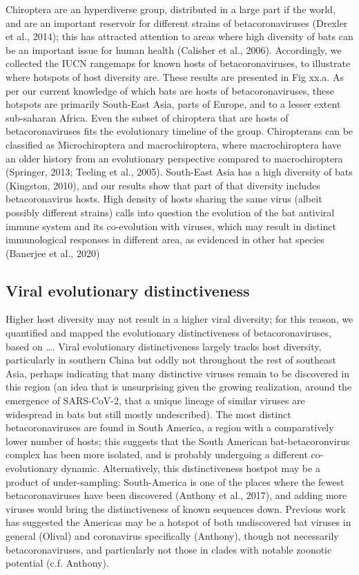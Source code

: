 \documentclass[10pt,oneside]{article}
\begin{document}
Chiroptera are an hyperdiverse group, distributed in a large part if the
world, and are an important reservoir for different strains of
betacoronaviruses (Drexler et al., 2014); this has attracted attention
to areas where high diversity of bats can be an important issue for
human health (Calisher et al., 2006). Accordingly, we collected the IUCN
rangemaps for known hosts of betacoronaviruses, to illustrate where
hotspots of host diversity are. These results are presented in Fig xx.a.
As per our current knowledge of which bats are hosts of
betacoronaviruses, these hotspots are primarily South-East Asia, parts
of Europe, and to a lesser extent sub-saharan Africa. Even the subset of
chiroptera that are hosts of betacoronaviruses fits the evolutionary
timeline of the group. Chiropterans can be classified as Microchiroptera
and macrochiroptera, where macrochiroptera have an older history from an
evolutionary perspective compared to macrochiroptera (Springer, 2013;
Teeling et al., 2005). South-East Asia has a high diversity of bats
(Kingston, 2010), and our results show that part of that diversity
includes betacoronavirus hosts. High density of hosts sharing the same
virus (albeit possibly different strains) calls into question the
evolution of the bat antiviral immune system and its co-evolution with
viruses, which may result in distinct immunological responses in
different area, as evidenced in other bat species (Banerjee et al.,
2020)

\hypertarget{viral-evolutionary-distinctiveness}{%
\subsection{Viral evolutionary
distinctiveness}\label{viral-evolutionary-distinctiveness}}

Higher host diversity may not result in a higher viral diversity; for
this reason, we quantified and mapped the evolutionary distinctiveness
of betacoronaviruses, based on \ldots. Viral evolutionary
distinctiveness largely tracks host diversity, particularly in southern
China but oddly not throughout the rest of southeast Asia, perhaps
indicating that many distinctive viruses remain to be discovered in this
region (an idea that is unsurprising given the growing realization,
around the emergence of SARS-CoV-2, that a unique lineage of similar
viruses are widespread in bats but still mostly undescribed). The most
distinct betacoronaviruses are found in South America, a region with a
comparatively lower number of hosts; this suggests that the South
American bat-betacoronvirus complex has been more isolated, and is
probably undergoing a different co-evolutionary dynamic. Alternatively,
this distinctiveness hostpot may be a product of under-sampling:
South-America is one of the places where the fewest betacoronaviruses
have been discovered (Anthony et al., 2017), and adding more viruses
would bring the distinctiveness of known sequences down. Previous work
has suggested the Americas may be a hotspot of both undiscovered bat
viruses in general (Olival) and coronavirus specifically (Anthony),
though not necessarily betacoronaviruses, and particularly not those in
clades with notable zoonotic potential (c.f. Anthony).
\end{document}

